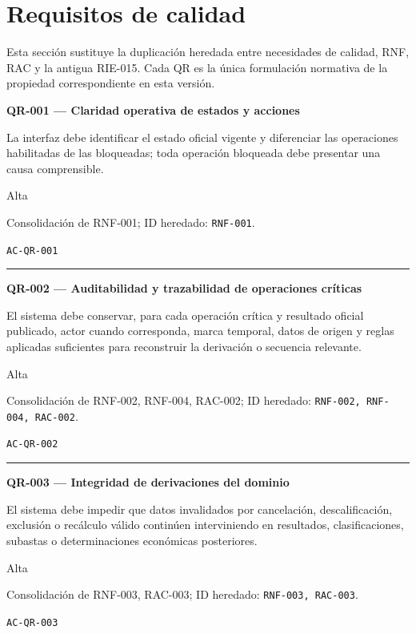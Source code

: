 \documentclass[10pt,letterpaper]{article}
\begin{document}
\section{Requisitos de calidad}
Esta sección sustituye la duplicación heredada entre necesidades de calidad, RNF, RAC y la antigua RIE-015. Cada QR es la única formulación normativa de la propiedad correspondiente en esta versión.

\noindent\textbf{QR-001 --- Claridad operativa de estados y acciones}\par
\begin{description}[style=nextline,leftmargin=3.15cm,labelwidth=2.8cm,font=\normalfont\bfseries]
\item[Obligación] La interfaz debe identificar el estado oficial vigente y diferenciar las operaciones habilitadas de las bloqueadas; toda operación bloqueada debe presentar una causa comprensible.
\item[Prioridad] Alta
\item[Procedencia] Consolidación de RNF-001; ID heredado: \texttt{RNF-001}.
\item[Verificación] \texttt{AC-QR-001}
\end{description}
\vspace{0.25em}\hrule\vspace{0.65em}
\noindent\textbf{QR-002 --- Auditabilidad y trazabilidad de operaciones críticas}\par
\begin{description}[style=nextline,leftmargin=3.15cm,labelwidth=2.8cm,font=\normalfont\bfseries]
\item[Obligación] El sistema debe conservar, para cada operación crítica y resultado oficial publicado, actor cuando corresponda, marca temporal, datos de origen y reglas aplicadas suficientes para reconstruir la derivación o secuencia relevante.
\item[Prioridad] Alta
\item[Procedencia] Consolidación de RNF-002, RNF-004, RAC-002; ID heredado: \texttt{RNF-002, RNF-004, RAC-002}.
\item[Verificación] \texttt{AC-QR-002}
\end{description}
\vspace{0.25em}\hrule\vspace{0.65em}
\noindent\textbf{QR-003 --- Integridad de derivaciones del dominio}\par
\begin{description}[style=nextline,leftmargin=3.15cm,labelwidth=2.8cm,font=\normalfont\bfseries]
\item[Obligación] El sistema debe impedir que datos invalidados por cancelación, descalificación, exclusión o recálculo válido continúen interviniendo en resultados, clasificaciones, subastas o determinaciones económicas posteriores.
\item[Prioridad] Alta
\item[Procedencia] Consolidación de RNF-003, RAC-003; ID heredado: \texttt{RNF-003, RAC-003}.
\item[Verificación] \texttt{AC-QR-003}
\end{description}
\end{document}
